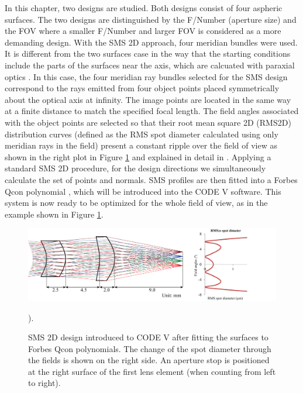 In this chapter, two designs are studied. Both designs consist of four aspheric surfaces. The two designs are distinguished by the F/Number (aperture size) and the FOV where a smaller F/Number and larger FOV is considered as a more demanding design. With the SMS 2D approach, four meridian bundles were used. It is different from the two surfaces case in the way that the starting conditions include the parts of the surfaces near the axis, which are calcuated with paraxial optics \cite{MinanoOE09}. In this case, the four meridian ray bundles selected for the SMS design correspond to the rays emitted from four object points placed symmetrically about the optical axis at infinity. The image points are located in the same way at a finite distance to match the specified focal length. The field angles associated with the object points are selected so that their root mean square 2D (RMS2D) distribution curves (defined as the RMS spot diameter calculated using only meridian rays in the field) present a constant ripple over the field of view as shown in the right plot in Figure \ref{fig: fig2_SMSdesignedSys} and explained in detail in \cite{LinWang12OE}. 
Applying a standard SMS 2D procedure, for the design directions we simultaneously calculate the set of points and normals. SMS profiles are then fitted into a Forbes Qcon polynomial \cite{ForbesOE07}, which will be introduced into the CODE V software. This system is now ready to be optimized for the whole field of view, as in the example shown in Figure \ref{fig: fig2_SMSdesignedSys}. 

\begin{figure}[h!]
    \centering
    \includegraphics[width=1\textwidth]{chapter-5/figures/Fig2_SMSdesignedSystem.png}
    \caption{SMS 2D design introduced to CODE V after fitting the surfaces to Forbes Qcon polynomials. The change of the spot diameter through the fields is shown on the right side. 
An aperture stop is positioned at the right surface of the first lens element (when counting from left to right).  }
    \label{fig: fig2_SMSdesignedSys}).
\end{figure}

